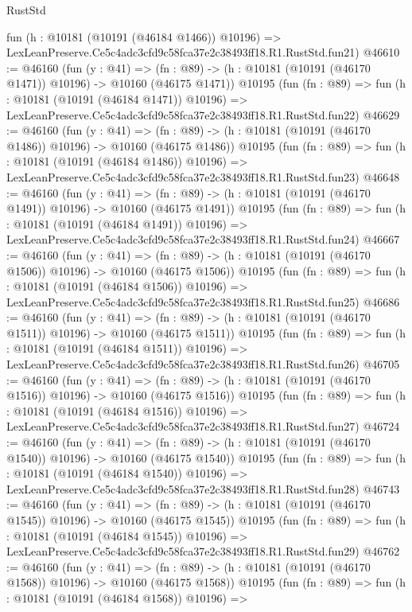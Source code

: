 \begin{lexlean}{RustStd}
\begin{coremodule}
    fun (h : @10181 (@10191 (@46184 @1466)) @10196) =>
    LexLeanPreserve.Ce5c4adc3cfd9c58fca37e2c38493ff18.R1.RustStd.fun21)
@46610 := @46160
    (fun (y : @41) =>
    (fn : @89) -> (h : @10181 (@10191 (@46170 @1471)) @10196) -> @10160 (@46175 @1471))
    @10195
    (fun (fn : @89) =>
    fun (h : @10181 (@10191 (@46184 @1471)) @10196) =>
    LexLeanPreserve.Ce5c4adc3cfd9c58fca37e2c38493ff18.R1.RustStd.fun22)
@46629 := @46160
    (fun (y : @41) =>
    (fn : @89) -> (h : @10181 (@10191 (@46170 @1486)) @10196) -> @10160 (@46175 @1486))
    @10195
    (fun (fn : @89) =>
    fun (h : @10181 (@10191 (@46184 @1486)) @10196) =>
    LexLeanPreserve.Ce5c4adc3cfd9c58fca37e2c38493ff18.R1.RustStd.fun23)
@46648 := @46160
    (fun (y : @41) =>
    (fn : @89) -> (h : @10181 (@10191 (@46170 @1491)) @10196) -> @10160 (@46175 @1491))
    @10195
    (fun (fn : @89) =>
    fun (h : @10181 (@10191 (@46184 @1491)) @10196) =>
    LexLeanPreserve.Ce5c4adc3cfd9c58fca37e2c38493ff18.R1.RustStd.fun24)
@46667 := @46160
    (fun (y : @41) =>
    (fn : @89) -> (h : @10181 (@10191 (@46170 @1506)) @10196) -> @10160 (@46175 @1506))
    @10195
    (fun (fn : @89) =>
    fun (h : @10181 (@10191 (@46184 @1506)) @10196) =>
    LexLeanPreserve.Ce5c4adc3cfd9c58fca37e2c38493ff18.R1.RustStd.fun25)
@46686 := @46160
    (fun (y : @41) =>
    (fn : @89) -> (h : @10181 (@10191 (@46170 @1511)) @10196) -> @10160 (@46175 @1511))
    @10195
    (fun (fn : @89) =>
    fun (h : @10181 (@10191 (@46184 @1511)) @10196) =>
    LexLeanPreserve.Ce5c4adc3cfd9c58fca37e2c38493ff18.R1.RustStd.fun26)
@46705 := @46160
    (fun (y : @41) =>
    (fn : @89) -> (h : @10181 (@10191 (@46170 @1516)) @10196) -> @10160 (@46175 @1516))
    @10195
    (fun (fn : @89) =>
    fun (h : @10181 (@10191 (@46184 @1516)) @10196) =>
    LexLeanPreserve.Ce5c4adc3cfd9c58fca37e2c38493ff18.R1.RustStd.fun27)
@46724 := @46160
    (fun (y : @41) =>
    (fn : @89) -> (h : @10181 (@10191 (@46170 @1540)) @10196) -> @10160 (@46175 @1540))
    @10195
    (fun (fn : @89) =>
    fun (h : @10181 (@10191 (@46184 @1540)) @10196) =>
    LexLeanPreserve.Ce5c4adc3cfd9c58fca37e2c38493ff18.R1.RustStd.fun28)
@46743 := @46160
    (fun (y : @41) =>
    (fn : @89) -> (h : @10181 (@10191 (@46170 @1545)) @10196) -> @10160 (@46175 @1545))
    @10195
    (fun (fn : @89) =>
    fun (h : @10181 (@10191 (@46184 @1545)) @10196) =>
    LexLeanPreserve.Ce5c4adc3cfd9c58fca37e2c38493ff18.R1.RustStd.fun29)
@46762 := @46160
    (fun (y : @41) =>
    (fn : @89) -> (h : @10181 (@10191 (@46170 @1568)) @10196) -> @10160 (@46175 @1568))
    @10195
    (fun (fn : @89) =>
    fun (h : @10181 (@10191 (@46184 @1568)) @10196) =>

\end{coremodule}
\end{lexlean}

